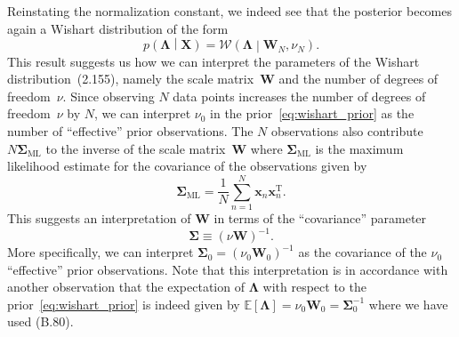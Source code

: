 \documentclass[12pt,a4paper]{article}
\begin{document}
Reinstating the normalization constant, we indeed see that the posterior becomes again
a Wishart distribution of the form
\begin{equation}
p\left(\bm{\Lambda}\middle|\mathbf{X}\right) =
\mathcal{W}\left(\bm{\Lambda}\middle|\mathbf{W}_N, \nu_N\right) .
\end{equation}
This result suggests us how we can interpret the parameters of
the Wishart distribution~(2.155), namely
the scale matrix~$\mathbf{W}$ and the number of degrees of freedom~$\nu$.
Since observing $N$ data points increases the number of degrees of freedom~$\nu$ by $N$,
we can interpret $\nu_0$ in the prior~\eqref{eq:wishart_prior} as
the number of ``effective'' prior observations.
The $N$ observations also contribute $N\bm{\Sigma}_{\text{ML}}$ to
the inverse of the scale matrix~$\mathbf{W}$
where $\bm{\Sigma}_{\text{ML}}$ is the maximum likelihood estimate for the covariance of
the observations given by
\begin{equation}
\bm{\Sigma}_{\text{ML}} = \frac{1}{N} \sum_{n=1}^{N}\mathbf{x}_n\mathbf{x}_n^{\operatorname{T}} .
\end{equation}
This suggests an interpretation of $\mathbf{W}$ in terms of the ``covariance'' parameter
\begin{equation}
\bm{\Sigma} \equiv \left(\nu\mathbf{W}\right)^{-1} .
\label{eq:covariance_parameter}
\end{equation}
More specifically, we can interpret $\bm{\Sigma}_0 = \left(\nu_0\mathbf{W}_0\right)^{-1}$ as
the covariance of the $\nu_0$ ``effective'' prior observations.
Note that this interpretation is in accordance with another observation that
the expectation of $\bm{\Lambda}$ with respect to
the prior~\eqref{eq:wishart_prior} is indeed given by
$\mathbb{E}\left[\bm{\Lambda}\right] = \nu_0\mathbf{W}_0 = \bm{\Sigma}_0^{-1}$
where we have used (B.80).
\end{document}
